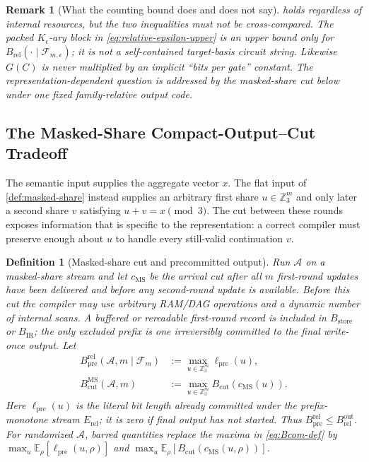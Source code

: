 \documentclass[aps,prx,reprint,floatfix,superscriptaddress]{revtex4-2}
\newtheorem{definition}{Definition}
\newtheorem{remark}{Remark}
\begin{document}
\begin{remark}[What the counting bound does and does not say]
\label{rem:pass-through}
 holds regardless of internal resources, but the
two inequalities must not be cross-compared.  The packed $K_\epsilon$-ary
block in \eqref{eq:relative-epsilon-upper} is an upper bound only for
$B_{\mathrm{rel}}(\cdot\mid\mathcal F_{m,\epsilon})$; it is not a
self-contained target-basis circuit string.  Likewise $G(C)$ is never
multiplied by an implicit ``bits per gate'' constant.  The
representation-dependent question is addressed by the masked-share cut
below under one fixed family-relative output code.
\end{remark}

\subsection{The Masked-Share Compact-Output--Cut Tradeoff}

The semantic input supplies the aggregate vector $x$.  The flat input of
\cref{def:masked-share} instead supplies an arbitrary first share
$u\in\mathbb Z_3^m$ and only later a second share $v$ satisfying
$u+v=x\pmod 3$.  The cut between these rounds exposes information that is
specific to the representation: a correct compiler must preserve enough
about $u$ to handle every still-valid continuation $v$.

\begin{definition}[Masked-share cut and precommitted output]
\label{def:cuts}
Run $\mathcal A$ on a masked-share stream and let $c_{\mathrm{MS}}$ be the
arrival cut after all $m$ first-round updates have been delivered and before
any second-round update is available.  Before this cut the compiler may use
arbitrary RAM/DAG operations and a dynamic number of internal scans.  A
buffered or rereadable first-round record is included in
$B_{\mathrm{store}}$ or $B_{\mathrm{IR}}$; the only excluded prefix is one
irreversibly committed to the final write-once output.  Let
\begin{equation}\label{eq:Bcom-def}
\begin{aligned}
 B_{\mathrm{pre}}^{\mathrm{rel}}(\mathcal A,m\mid\mathcal F_m)
 &:=\max_{u\in\mathbb Z_3^m}
 \ell_{\mathrm{pre}}(u),\\
 B_{\mathrm{cut}}^{\mathrm{MS}}(\mathcal A,m)
 &:=\max_{u\in\mathbb Z_3^m}B_{\mathrm{cut}}(c_{\mathrm{MS}}(u)).
\end{aligned}
\end{equation}
Here $\ell_{\mathrm{pre}}(u)$ is the literal bit length already committed
under the prefix-monotone stream $E_{\mathrm{rel}}$; it is zero if final
output has not started.  Thus
$B_{\mathrm{pre}}^{\mathrm{rel}}\leq
B_{\mathrm{rel}}^{\mathrm{out}}$.
For randomized $\mathcal A$, barred quantities replace the maxima in
\eqref{eq:Bcom-def} by
$\max_u\mathbb E_\rho[\ell_{\mathrm{pre}}(u,\rho)]$ and
$\max_u\mathbb E_\rho[B_{\mathrm{cut}}(c_{\mathrm{MS}}(u,\rho))]$.
\end{definition}
\end{document}
